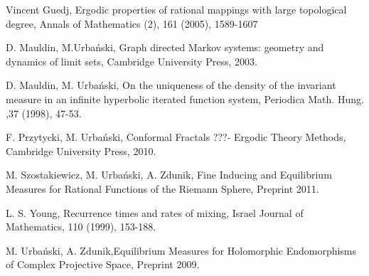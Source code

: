 \documentclass[12pt]{amsart}
\numberwithin{equation}{section}
\begin{document}
\begin{thebibliography}{9999999}

 Vincent Guedj, Ergodic properties of rational mappings with large topological degree, Annals of Mathematics (2), 161 (2005), 1589-1607

D. Mauldin, M.Urba\'nski, Graph directed Markov
  systems: geometry and dynamics of limit sets, Cambridge University
  Press, 2003.

D. Mauldin, M. Urba\'nski, On the uniqueness of the
  density of the invariant measure in an infinite hyperbolic iterated
  function system, Periodica Math. Hung. ,37 (1998), 47-53.

F. Przytycki, M. Urba\'nski, Conformal Fractals ???-
Ergodic Theory Methods, Cambridge University Press, 2010.

M. Szostakiewicz, M. Urba\'nski, A. Zdunik,
Fine Inducing and Equilibrium Measures for Rational Functions of the
Riemann Sphere, Preprint 2011.

L. S. Young, Recurrence times and rates of
mixing, Israel Journal of Mathematics, 110 (1999), 153-188.

M. Urba\'nski, A. Zdunik,Equilibrium Measures for Holomorphic
Endomorphisms of Complex Projective Space, Preprint 2009.


\end{thebibliography}
\end{document}
